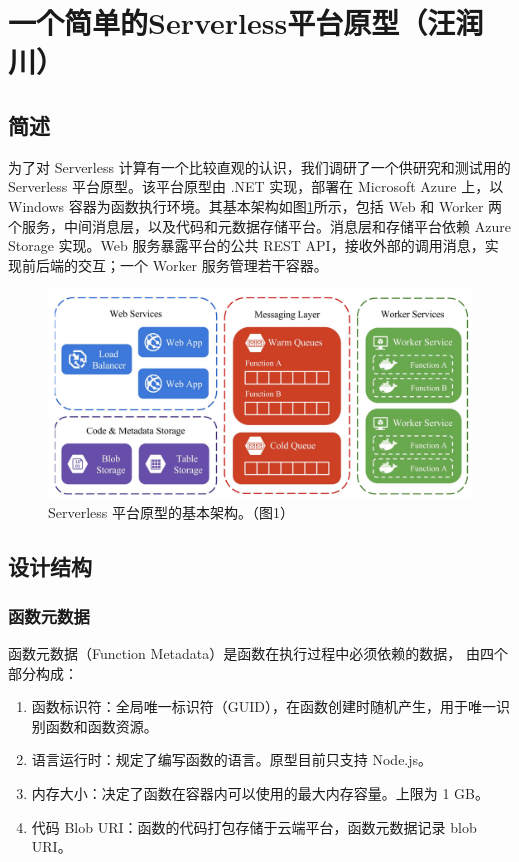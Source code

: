 \documentclass[11pt]{article}
\begin{document}
\section{一个简单的Serverless平台原型（汪润川）}
\subsection{简述}
为了对 Serverless 计算有一个比较直观的认识，我们调研了一个供研究和测试用的 Serverless 平台原型\cite{mcgrath2017serverless}。该平台原型由 .NET 实现，部署在 Microsoft Azure 上，以 Windows 容器为函数执行环境。其基本架构如图\ref{figs:mcgrath2017_structure}所示，包括 Web 和 Worker 两个服务，中间消息层，以及代码和元数据存储平台。消息层和存储平台依赖 Azure Storage 实现。Web 服务暴露平台的公共 REST API，接收外部的调用消息，实现前后端的交互；一个 Worker 服务管理若干容器。
\begin{figure}[!htbp]
	\centering
	\includegraphics[width=1.0\linewidth]{figs/2017serverless_structure}
	\caption{Serverless 平台原型的基本架构。（\cite{mcgrath2017serverless}图1）}
	\label{figs:mcgrath2017_structure}
\end{figure}

\subsection{设计结构}
\subsubsection{函数元数据}
函数元数据（Function Metadata）是函数在执行过程中必须依赖的数据， 由四个部分构成：
\begin{enumerate}
	\item 函数标识符：全局唯一标识符（GUID），在函数创建时随机产生，用于唯一识别函数和函数资源。
	\item 语言运行时：规定了编写函数的语言。原型目前只支持 Node.js。
	\item 内存大小：决定了函数在容器内可以使用的最大内存容量。上限为 1 GB。
	\item 代码 Blob URI：函数的代码打包存储于云端平台，函数元数据记录 blob URI。
\end{enumerate}
\end{document}
